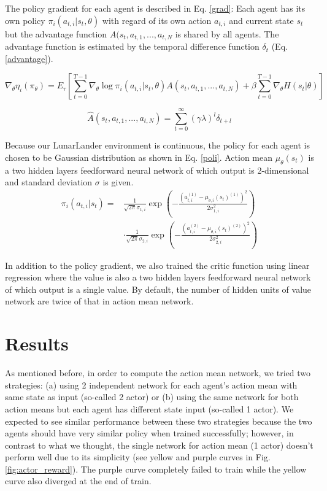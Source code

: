 \documentclass[12pt, letter]{article}
\begin{document}
The policy gradient for each agent is described in Eq. \ref{grad}: Each agent has its own policy $\pi_i(a_{t, i}|s_t, \theta)$ with regard of its own action $a_{t, i}$ and current state $s_t$ but the advantage function $A(s_t, a_{t, 1}, ..., a_{t, N}$ is shared by all agents. The advantage function is estimated by the temporal difference function $\delta_t$ (Eq. \ref{advantage}).

\begin{equation}
\nabla_{\theta}\eta_i(\pi_{\theta}) = E_{\tau}[\sum^{T-1}_{t=0}\nabla_{\theta}\log\pi_i(a_{t, i}|s_t, \theta)A(s_t, a_{t, 1}, ..., a_{t, N}) + \beta\sum^{T-1}_{t=0}\nabla_{\theta}H(s_t|\theta)]
\label{grad}
\end{equation}

\begin{equation}
\hat{A}(s_t, a_{t, 1}, ..., a_{t, N}) = \sum^{\infty}_{t=0} (\gamma \lambda)^l \delta_{t+l}
\label{advantage}
\end{equation}

Because our LunarLander environment is continuous, the policy for each agent is chosen to be Gaussian distribution as shown in Eq. \ref{poli}. Action mean $\mu_{\theta}(s_t)$ is a two hidden layers feedforward neural network of which output is 2-dimensional and standard deviation $\sigma$ is given.
\begin{align}
\pi_i(a_{t, i}|s_t) = & \frac{1}{\sqrt{2\pi} \sigma_{1, i}} \exp( -\frac{(a_{t, i}^{(1)}-\mu_{\theta, i}(s_t)^{(1)})^2}{2\sigma_{1, i}^2}) \nonumber \\
& \cdot \frac{1}{\sqrt{2\pi} \sigma_{2, i}} \exp( -\frac{(a_{t, i}^{(2)}-\mu_{\theta, i}(s_t)^{(2)})^2}{2\sigma_{2, i}^2})
\label{poli}
\end{align}

In addition to the policy gradient, we also trained the critic function using linear regression where the value is also a two hidden layers feedforward neural network of which output is a single value. By default, the number of hidden units of value network are twice of that in action mean network.

\section{Results}

As mentioned before, in order to compute the action mean network, we tried two strategies: (a) using 2 independent network for each agent's action mean with same state as input (so-called 2 actor) or (b) using the same network for both action means but each agent has different state input (so-called 1 actor). We expected to see similar performance between these two strategies because the two agents should have very similar policy when trained successfully; however, in contrast to what we thought, the single network for action mean (1 actor) doesn't perform well due to its simplicity (see yellow and purple curves in Fig. \ref{fig:actor_reward}). The purple curve completely failed to train while the yellow curve also diverged at the end of train.
\end{document}
